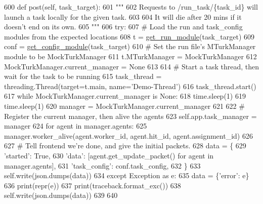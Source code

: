 \begin{DoxyCode}
600     \textcolor{keyword}{def }post(self, task\_target):
601         \textcolor{stringliteral}{"""}
602 \textcolor{stringliteral}{        Requests to /run\_task/\{task\_id\} will launch a task locally for the given task.}
603 \textcolor{stringliteral}{}
604 \textcolor{stringliteral}{        It will die after 20 mins if it doesn't end on its own.}
605 \textcolor{stringliteral}{        """}
606         \textcolor{keywordflow}{try}:
607             \textcolor{comment}{# Load the run and task\_config modules from the expected locations}
608             t = \hyperlink{namespaceparlai_1_1mturk_1_1webapp_1_1server_a49eb9835228f9f47f9aa55bc6369c23f}{get\_run\_module}(task\_target)
609             conf = \hyperlink{namespaceparlai_1_1mturk_1_1webapp_1_1server_aee065cfdb6346d4815762ae793427f1e}{get\_config\_module}(task\_target)
610             \textcolor{comment}{# Set the run file's MTurkManager module to be MockTurkManager}
611             t.MTurkManager = MockTurkManager
612             MockTurkManager.current\_manager = \textcolor{keywordtype}{None}
613 
614             \textcolor{comment}{# Start a task thread, then wait for the task to be running}
615             task\_thread = threading.Thread(target=t.main, name=\textcolor{stringliteral}{'Demo-Thread'})
616             task\_thread.start()
617             \textcolor{keywordflow}{while} MockTurkManager.current\_manager \textcolor{keywordflow}{is} \textcolor{keywordtype}{None}:
618                 time.sleep(1)
619             time.sleep(1)
620             manager = MockTurkManager.current\_manager
621 
622             \textcolor{comment}{# Register the current manager, then alive the agents}
623             self.app.task\_manager = manager
624             \textcolor{keywordflow}{for} agent \textcolor{keywordflow}{in} manager.agents:
625                 manager.worker\_alive(agent.worker\_id, agent.hit\_id, agent.assignment\_id)
626 
627             \textcolor{comment}{# Tell frontend we're done, and give the initial packets.}
628             data = \{
629                 \textcolor{stringliteral}{'started'}: \textcolor{keyword}{True},
630                 \textcolor{stringliteral}{'data'}: [agent.get\_update\_packet() \textcolor{keywordflow}{for} agent \textcolor{keywordflow}{in} manager.agents],
631                 \textcolor{stringliteral}{'task\_config'}: conf.task\_config,
632             \}
633             self.write(json.dumps(data))
634         \textcolor{keywordflow}{except} Exception \textcolor{keyword}{as} e:
635             data = \{\textcolor{stringliteral}{'error'}: e\}
636             print(repr(e))
637             print(traceback.format\_exc())
638             self.write(json.dumps(data))
639 
640 
\end{DoxyCode}


